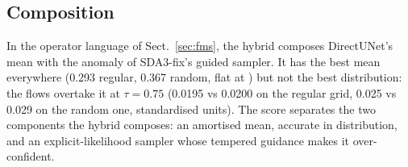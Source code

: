 \subsection{Composition}
In the operator language of Sect.~\ref{sec:fms}, the hybrid composes DirectUNet's
mean with the anomaly of SDA3-fix's guided sampler. It has the best mean
everywhere (0.293 regular, 0.367 random, flat at \So) but not the best
distribution: the flows overtake it at $\tau = 0.75$ (0.0195 vs 0.0200 on the
regular grid, 0.025 vs 0.029 on the random one, standardised units). The score
separates the two components the hybrid composes: an amortised mean, accurate in
distribution, and an explicit-likelihood sampler whose tempered guidance makes it
over-confident.
